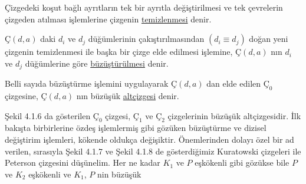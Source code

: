 \documentclass[11pt]{amsbook}
\begin{document}
	
    \begin{definition}
   	 Çizgedeki koşut bağlı ayrıtların tek bir ayrıtla değiştirilmesi ve tek çevrelerin çizgeden atılması işlemlerine çizgenin \underline{temizlenmesi} denir.
    \end{definition}
    
    \begin{definition}
	$Ç(d,a)$ daki $d_i$ ve $d_j$ düğümlerinin çakıştırılmasından $(d_i \equiv d_j)$ doğan yeni çizgenin temizlenmesi ile başka bir çizge elde edilmesi işlemine, $Ç(d,a)$ nın $d_i$ ve $d_j$ düğümlerine göre \underline{büzüştürülmesi} denir.
	\end{definition}

	\begin{definition}
    Belli sayıda büzüştürme işlemini uygulayarak $Ç(d,a)$ dan elde edilen $Ç_0$ çizgesine, $Ç(d,a)$ nın büzüşük \underline{altçizgesi} denir.
    \end{definition}

Şekil 4.1.6 da gösterilen $Ç_0$ çizgesi, $Ç_1$ ve $Ç_2$ çizgelerinin büzüşük altçizgesidir. İlk bakışta birbirlerine özdeş işlemlermiş gibi gözüken büzüştürme ve dizisel değiştirim işlemleri, kökende oldukça değişiktir. Önemlerinden dolayı özel bir ad verilen, sırasıyla Şekil 4.1.7 ve Şekil 4.1.8 de gösterdiğimiz Kuratowski çizgeleri ile Peterson çizgesini düşünelim. Her ne kadar $K_1$ ve $P$ eşkökenli gibi gözükse bile $P$ ve $K_2$ eşkökenli ve $K_1$, $P$ nin büzüşük 
\end{document}
